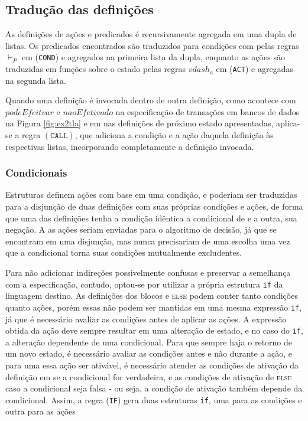\subsection{Tradução das definições}

As definições de ações e predicados é recursivamente agregada em uma dupla de
listas. Os predicados encontrados são traduzidos para condições com pelas regras
$\vdash_P$ em (\texttt{COND}) e agregados na primeira lista da dupla, enquanto as ações são
traduzidas em funções sobre o estado pelas regras $vdash_a$ em (\texttt{ACT}) e agregadas na
segunda lista.

Quando uma definição é invocada dentro de outra definição, como acontece com
$podeEfeitvar$ e $naoEfetivado$ na especificação de transações em bancos de
dados na Figura \ref{fig:ex2tla} e em nas definições de próximo estado apresentadas, aplica-se a regra
$(\texttt{CALL})$, que adiciona a condição e a ação daquela definição às
respectivas listas, incorporando completamente a definição invocada.



\subsubsection{Condicionais}

Estruturas \IF definem ações com base em uma condição, e poderiam ser traduzidas
para a disjunção de duas definições com suas próprias condições e ações, de forma que uma das
definições tenha a condição idêntica a condicional de \IF e a outra, sua
negação. A as ações seriam enviadas para o algoritmo de decisão, já que se
encontram em uma disjunção, mas nunca precisariam de uma escolha uma vez que a
condicional torna suas condições mutualmente excludentes.

Para não adicionar
indireções possivelmente confusas e preservar a semelhança com a especificação, contudo, optou-se por utilizar
a própria estrutura \texttt{if} da linguagem destino. As definições dos blocos
\IF e \textsc{else} podem conter tanto condições quanto ações, porém essas não
podem ser mantidas em uma mesma expressão \texttt{if}, já que é necessário
avaliar as condições antes de aplicar as ações. A expressão obtida da ação deve
sempre resultar em uma alteração de estado, e no caso do \texttt{if}, a alteração
dependente de uma condicional. Para que sempre haja o retorno de um novo estado, é necessário avaliar as
condições antes e não durante a ação, e para uma essa ação \IF ser ativável, é necessário
atender as condições de ativação da definição em
\THEN se a condicional for verdadeira, e as condições de ativação de \textsc{else} caso
a condicional seja falsa - ou seja, a condição de ativação também depende da
condicional. Assim, a regra (\texttt{IF}) gera duas estruturas \texttt{if}, uma
para as condições e outra para as ações

